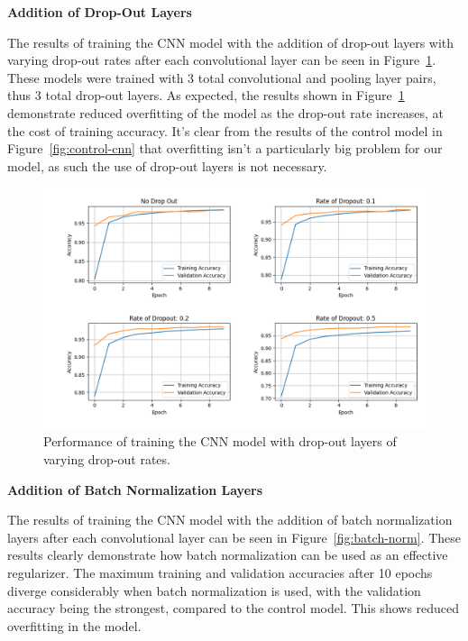 \documentclass[a4paper]{article}
\begin{document}
\textbf{Addition of Drop-Out Layers}

The results of training the CNN model with the addition of drop-out layers with varying drop-out rates after each convolutional layer can be seen in Figure~\ref{fig:drop-out}. These models were trained with 3 total convolutional and pooling layer pairs, thus 3 total drop-out layers. As expected, the results shown in Figure~\ref{fig:drop-out} demonstrate reduced overfitting of the model as the drop-out rate increases, at the cost of training accuracy. It's clear from the results of the control model in Figure~\ref{fig:control-cnn} that overfitting isn't a particularly big problem for our model, as such the use of drop-out layers is not necessary. 

\begin{figure}[h!]
    \centering
    \includegraphics[scale=0.45]{images/drop-out-cnn.png}
    \caption{Performance of training the CNN model with drop-out layers of varying drop-out rates.}
    \label{fig:drop-out}
\end{figure}

\textbf{Addition of Batch Normalization Layers}

The results of training the CNN model with the addition of batch normalization layers after each convolutional layer can be seen in Figure~\ref{fig:batch-norm}. These results clearly demonstrate how batch normalization can be used as an effective regularizer. The maximum training and validation accuracies after 10 epochs diverge considerably when batch normalization is used, with the validation accuracy being the strongest, compared to the control model. This shows reduced overfitting in the model.
\end{document}
